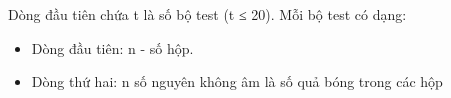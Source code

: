 Dòng đầu tiên chứa t là số bộ test (t ≤ 20). Mỗi bộ test có dạng:  
\begin{itemize}
	\item     Dòng đầu tiên: n - số hộp.    


	\item     Dòng thứ hai: n số nguyên không âm là số quả bóng trong các hộp   
\end{itemize}

\